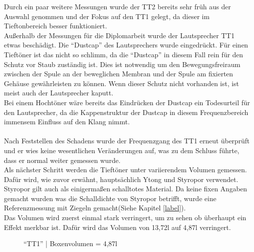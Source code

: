 \newpage
Durch ein paar weitere Messungen wurde der TT2 bereits sehr früh aus der Auswahl genommen und der Fokus auf den TT1 gelegt, da dieser im Tieftonbereich besser funktioniert.
\\
Außerhalb der Messungen für die Diplomarbeit wurde der Lautsprecher TT1 etwas beschädigt.
Die \enquote{Dustcap} des Lautsprechers wurde eingedrückt.
Für einen Tieftöner ist das nicht so schlimm, da die \enquote{Dustcap} in diesem Fall rein für den Schutz vor Staub zuständig ist.
Dies ist notwendig um den Bewegungsfreiraum zwischen der Spule an der beweglichen Membran und der Spule am fixierten Gehäuse gewährleisten zu können.
Wenn dieser Schutz nicht vorhanden ist, ist meist auch der Lautsprecher kaputt.\\
Bei einem Hochtöner wäre bereits das Eindrücken der Dustcap ein Todesurteil für den Lautsprecher, da die Kappenstruktur der Dustcap in diesem Frequenzbereich immensem Einfluss auf den Klang nimmt.
\\ \\
Nach Feststellen des Schadens wurde der Frequenzgang des TT1 erneut überprüft und er wies keine wesentlichen Veränderungen auf, was zu dem Schluss führte, dass er normal weiter gemessen wurde.\\
Als nächster Schritt werden die Tieftöner unter variierendem Volumen gemessen.
Dafür wird, wie zuvor erwähnt, hauptsächlich Ytong und Styropor verwendet.
Styropor gilt auch als einigermaßen schalltotes Material.
Da keine fixen Angaben gemacht wurden was die Schalldichte von Styropor betrifft, wurde eine Referenzmessung mit Ziegeln gemacht(Siehe Kapitel \ref{label}). %
\\
Das Volumen wird zuerst einmal stark verringert, um zu sehen ob überhaupt ein Effekt merkbar ist.
Dafür wird das Volumen von 13,72l auf 4,87l verringert.
\begin{figure} [H]
	\centering
	\caption{\enquote{TT1} | Boxenvolumen = 4,87l}
	\label {fig:5.3.4.3}
\end{figure}












